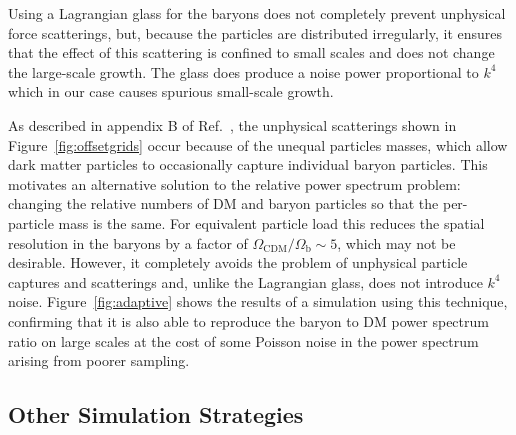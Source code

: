 \documentclass[a4paper,11pt]{article}
\begin{document}
Using a Lagrangian glass for the baryons does not completely prevent unphysical force scatterings, but, because the particles are distributed irregularly, it ensures that the effect of this scattering is confined to small scales and does not change the large-scale growth. The glass does produce a noise power proportional to $k^4$ which in our case causes spurious small-scale growth.

As described in appendix B of Ref.~\cite{OLeary:2012}, the unphysical scatterings shown in Figure~\ref{fig:offsetgrids} occur because of the unequal particles masses, which allow dark matter particles to occasionally capture individual baryon particles. This motivates
an alternative solution to the relative power spectrum problem: changing the relative numbers of DM and baryon particles so that the per-particle mass is the same. For equivalent particle load this reduces the spatial resolution in the baryons by a factor of $\Omega_\mathrm{CDM}/\Omega_\mathrm{b} \sim 5$, which may not be desirable. However, it completely avoids the problem of unphysical particle captures and scatterings and, unlike the Lagrangian glass, does not introduce $k^4$ noise. Figure~\ref{fig:adaptive} shows the results of a simulation using this technique, confirming that it is also able to reproduce the baryon to DM power spectrum ratio on large scales at the cost of some Poisson noise in the power spectrum arising from poorer sampling.


\subsection{Other Simulation Strategies}
\label{sec:otherstrat}
\end{document}
